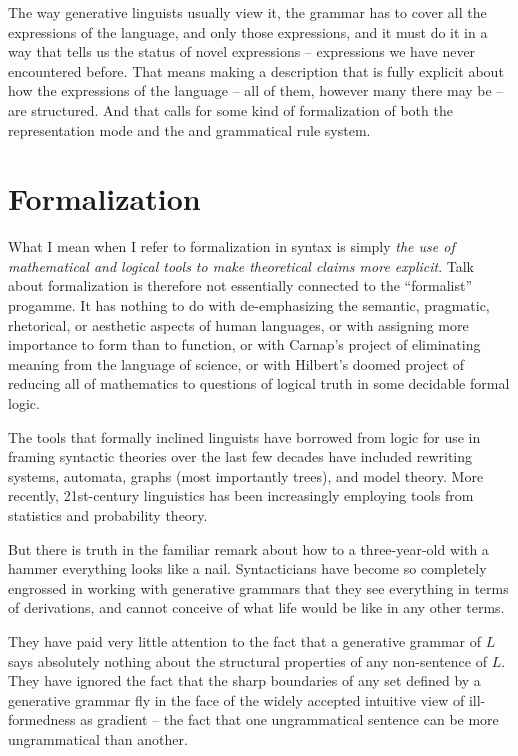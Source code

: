 \documentclass[output=paper]{langscibook}
\begin{document}
 The way generative linguists usually view it, the grammar has to cover all the expressions of the language, and only those expressions, and it must do it in a way that tells us the status of novel expressions – expressions we have never encountered before. That means making a description that is fully explicit about how the expressions of the language – all of them, however many there may be – are structured. And that calls for some kind of formalization of both the representation mode and the and grammatical rule system.

\section{Formalization}
\label{sec:pullum:formalization}

What I mean when I refer to formalization in syntax is simply \emph{the use of mathematical and logical tools to make theoretical claims more explicit}. Talk about formalization is therefore not essentially connected to the ``formalist'' progamme. It has nothing to do with de-emphasizing the semantic, pragmatic, rhetorical, or aesthetic aspects of human languages, or with assigning more importance to form than to function, or with Carnap's project of eliminating meaning from the language of science, or with Hilbert's doomed project of reducing all of mathematics to questions of logical truth in some decidable formal logic.

The tools that formally inclined linguists have borrowed from logic for use in framing syntactic theories over the last few decades have included rewriting systems, automata, graphs (most importantly trees), and model theory.  More recently, 21st-century linguistics has been increasingly employing tools from statistics and probability theory.

But there is truth in the familiar remark about how to a three-year-old with a hammer everything looks like a nail.  Syntacticians have become so completely engrossed in working with generative grammars that they see everything in terms of derivations, and cannot conceive of what life would be like in any other terms.

They have paid very little attention to the fact that a generative grammar of $L$ says absolutely nothing about the structural properties of any non-sentence of $L$. They have ignored the fact that the sharp boundaries of any set defined by a generative grammar fly in the face of the widely accepted intuitive view of ill-formedness as gradient – the fact that one ungrammatical sentence can be more ungrammatical than another.
\end{document}
